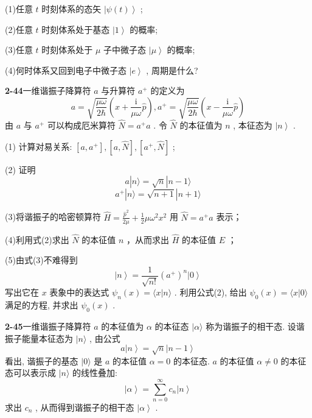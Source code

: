 (1)任意 $t$ 时刻体系的态矢 $\left|\psi(t)\right\rangle$ ; 

(2)任意 $t$ 时刻体系处于基态 $\left|1\right\rangle$ 的概率; 

(3)任意 $t$ 时刻体系处于 $\mu$ 子中微子态 $\left|\mu\right\rangle$ 的概率; 

(4)何时体系又回到电子中微子态 $\left|e\right\rangle$ , 周期是什么?

\vfill

\newpage
\vfill

\noindent
\textbf{2-44}\quad 一维谐振子降算符 $a$ 与升算符 $a^{+}$ 的定义为
\begin{equation}\tag{1}
a = \sqrt {\frac {\mu \omega}{2 \hbar}} \left(x + \frac {\mathrm{i}}{\mu \omega} \hat {p}\right), a ^ {+} = \sqrt {\frac {\mu \omega}{2 \hbar}} \left(x - \frac {\mathrm{i}}{\mu \omega} \hat {p}\right)
\end{equation}
由 $a$ 与 $a^{+}$ 可以构成厄米算符 $\hat{N} = a^{+}a$ . 令 $\hat{N}$ 的本征值为 $n$ , 本征态为 $\left|n\right\rangle$ . 

(1) 计算对易关系: $[a, a^{+}], [a, \hat{N}], [a^{+}, \hat{N}]$ ; 

(2) 证明
\begin{equation}\tag{2}
a | n \rangle = \sqrt {n} | n - 1 \rangle
\end{equation}
\begin{equation}\tag{3}
a ^ {+} | n \rangle = \sqrt {n + 1} | n + 1 \rangle
\end{equation}

(3)将谐振子的哈密顿算符 $\hat{H} = \frac{\hat{p}^2}{2\mu} + \frac{1}{2}\mu \omega^2 x^2$ 用 $\hat{N} = a^+ a$ 表示；

(4)利用式(2)求出 $\hat{N}$ 的本征值 $n$ ，从而求出 $\hat{H}$ 的本征值 $E$ ；

(5)由式(3)不难得到
\begin{equation}\tag{4}
\left| n \right\rangle = \frac {1}{\sqrt {n !}} (a ^ {+}) ^ {n} \left| 0 \right\rangle
\end{equation}
写出它在 $x$ 表象中的表达式 $\psi_{n}(x) = \langle x|n\rangle$ . 利用公式(2), 给出 $\psi_{0}(x) = \langle x|0\rangle$ 满足的方程, 并求出 $\psi_{0}(x)$ .

\vfill

\newpage
\vfill

\noindent
\textbf{2-45}\quad 一维谐振子降算符 $a$ 的本征值为 $\alpha$ 的本征态 $|\alpha\rangle$ 称为谐振子的相干态. 设谐振子能量本征态为 $|n\rangle$ , 由公式
\begin{equation}\tag{1}
a \left| n \right\rangle = \sqrt {n} \left| n - 1 \right\rangle
\end{equation}
看出, 谐振子的基态 $|0\rangle$ 是 $a$ 的本征值 $\alpha = 0$ 的本征态. $a$ 的本征值 $\alpha \neq 0$ 的本征态可以表示成 $|n\rangle$ 的线性叠加:
\begin{equation}\tag{2}
\left| \alpha \right\rangle = \sum_ {n = 0} ^ {\infty} c _ {n} \left| n \right\rangle
\end{equation}
求出 $c_{n}$ , 从而得到谐振子的相干态 $\left|\alpha\right\rangle$ .

